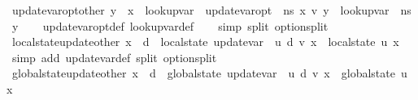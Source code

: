 \begin{isabellebody}
\isanewline
{}\isamarkupfalse%
\ update{\isacharunderscore}{\kern0pt}var{\isacharunderscore}{\kern0pt}opt{\isacharunderscore}{\kern0pt}other{\isacharcolon}{\kern0pt}\ {\isachardoublequoteopen}y\ {\isasymnoteq}\ x\ {\isasymLongrightarrow}\ lookup{\isacharunderscore}{\kern0pt}var\ {\isasymLambda}\ {\isacharparenleft}{\kern0pt}update{\isacharunderscore}{\kern0pt}var{\isacharunderscore}{\kern0pt}opt\ {\isasymLambda}\ n{\isacharunderscore}{\kern0pt}s\ x\ v{\isacharparenright}{\kern0pt}\ y\ {\isacharequal}{\kern0pt}\ lookup{\isacharunderscore}{\kern0pt}var\ {\isasymLambda}\ n{\isacharunderscore}{\kern0pt}s\ y{\isachardoublequoteclose}\isanewline
%
\isadelimproof
\ \ %
\endisadelimproof
%
\isatagproof
{}\isamarkupfalse%
\ update{\isacharunderscore}{\kern0pt}var{\isacharunderscore}{\kern0pt}opt{\isacharunderscore}{\kern0pt}def\ lookup{\isacharunderscore}{\kern0pt}var{\isacharunderscore}{\kern0pt}def\isanewline
\ \ \isamarkupfalse%
\ {\isacharparenleft}{\kern0pt}simp\ split{\isacharcolon}{\kern0pt}\ option{\isachardot}{\kern0pt}split{\isacharparenright}{\kern0pt}%
\endisatagproof
{\isafoldproof}%
%
\isadelimproof
\isanewline
%
\endisadelimproof
\isanewline
{}\isamarkupfalse%
\ local{\isacharunderscore}{\kern0pt}state{\isacharunderscore}{\kern0pt}update{\isacharunderscore}{\kern0pt}other{\isacharcolon}{\kern0pt}\ {\isachardoublequoteopen}x\ {\isasymnoteq}\ d\ {\isasymLongrightarrow}\ {\isacharparenleft}{\kern0pt}local{\isacharunderscore}{\kern0pt}state\ {\isacharparenleft}{\kern0pt}update{\isacharunderscore}{\kern0pt}var\ {\isasymLambda}\ u\ d\ v{\isacharparenright}{\kern0pt}\ x{\isacharparenright}{\kern0pt}\ {\isacharequal}{\kern0pt}\ local{\isacharunderscore}{\kern0pt}state\ u\ x{\isachardoublequoteclose}\isanewline
%
\isadelimproof
\ \ %
\endisadelimproof
%
\isatagproof
{}\isamarkupfalse%
\ {\isacharparenleft}{\kern0pt}simp\ add{\isacharcolon}{\kern0pt}\ update{\isacharunderscore}{\kern0pt}var{\isacharunderscore}{\kern0pt}def\ split{\isacharcolon}{\kern0pt}\ option{\isachardot}{\kern0pt}split{\isacharparenright}{\kern0pt}%
\endisatagproof
{\isafoldproof}%
%
\isadelimproof
\isanewline
%
\endisadelimproof
\isanewline
{}\isamarkupfalse%
\ global{\isacharunderscore}{\kern0pt}state{\isacharunderscore}{\kern0pt}update{\isacharunderscore}{\kern0pt}other{\isacharcolon}{\kern0pt}\ {\isachardoublequoteopen}x\ {\isasymnoteq}\ d\ {\isasymLongrightarrow}\ {\isacharparenleft}{\kern0pt}global{\isacharunderscore}{\kern0pt}state\ {\isacharparenleft}{\kern0pt}update{\isacharunderscore}{\kern0pt}var\ {\isasymLambda}\ u\ d\ v{\isacharparenright}{\kern0pt}\ x{\isacharparenright}{\kern0pt}\ {\isacharequal}{\kern0pt}\ global{\isacharunderscore}{\kern0pt}state\ u\ x{\isachardoublequoteclose}\isanewline

\end{isabellebody}
